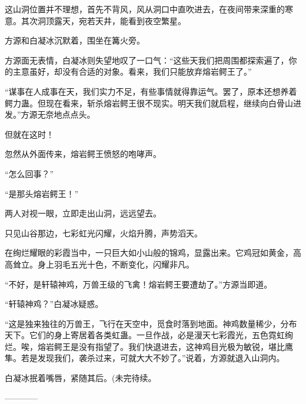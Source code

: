 \begin{this_body}
这山洞位置并不理想，首先不背风，风从洞口中直吹进去，在夜间带来深重的寒意。其次洞顶露天，宛若天井，能看到夜空繁星。

方源和白凝冰沉默着，围坐在篝火旁。

方源面无表情，白凝冰则失望地叹了一口气：“这些天我们把周围都探索遍了，你的主意虽好，却没有合适的对象。看来，我们只能放弃熔岩鳄王了。”

“谋事在人成事在天，我们实力不足，有些事情就得靠运气。罢了，原本还想养着鳄力蛊。但现在看来，斩杀熔岩鳄王很不现实。明天我们就启程，继续向白骨山进发。”方源无奈地点点头。

但就在这时！

忽然从外面传来，熔岩鳄王愤怒的咆哮声。

“怎么回事？”

“是那头熔岩鳄王！”

两人对视一眼，立即走出山洞，远远望去。

只见山谷那边，七彩虹光闪耀，火焰升腾，声势滔天。

在绚烂耀眼的彩霞当中，一只巨大如小山般的锦鸡，显露出来。它鸡冠如黄金，高高耸立。身上羽毛五光十色，不断变化，闪耀非凡。

“不好，是轩辕神鸡，万兽王级的飞禽！熔岩鳄王要遭劫了。”方源当即道。

“轩辕神鸡？”白凝冰疑惑。

“这是独来独往的万兽王，飞行在天空中，觅食时落到地面。神鸡数量稀少，分布天下。它们的身上寄居着各类虹蛊。一旦作战，必是漫天七彩霞光，五色霓虹绚烂。唉，熔岩鳄王是没有指望了。我们快退进去，这神鸡目光极为敏锐，堪比鹰隼。若是发现我们，袭杀过来，可就大大不妙了。”说着，方源就退入山洞内。

白凝冰抿着嘴唇，紧随其后。(未完待续。

------------

\end{this_body}

